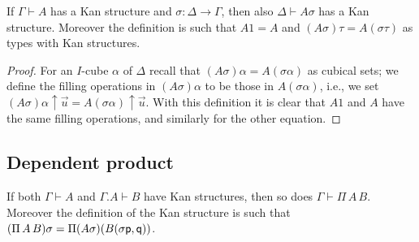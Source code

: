 \documentclass[10pt,a4paper]{article}
\newcommand{\pp}{{\sf p}}
\newcommand{\qq}{{\sf q}}
\newcommand{\rup}[1]{#1{\uparrow}}
\begin{document}
\begin{theorem}
  If $\Gamma \vdash A$ has a Kan structure and $\sigma \colon \Delta
  \to \Gamma$, then also $\Delta \vdash A \sigma$ has a Kan structure.
  Moreover the definition is such that $A 1 = A$ and $(A \sigma) \tau
  = A (\sigma \tau)$ as types with Kan structures.
\end{theorem}
\begin{proof}
  For an $I$-cube $\alpha$ of $\Delta$ recall that $(A \sigma) \alpha
  = A (\sigma \alpha)$ as cubical sets; we define the filling
  operations in $(A \sigma) \alpha$ to be those in $A (\sigma
  \alpha)$, i.e., we set $\rup{(A \sigma) \alpha} {\vec u} = \rup {A
    (\sigma \alpha)} {\vec u}$.  With this definition it is clear that
  $A 1$ and $A$ have the same filling operations, and similarly for
  the other equation.
\end{proof}

\subsection{Dependent product}

\begin{theorem}
  If both $\Gamma\vdash A$ and $\Gamma.A\vdash B$ have Kan structures,
  then so does $\Gamma\vdash\Pi\,A\,B$.  Moreover the definition of
  the Kan structure is such that $(\Pi\,A\,B) \sigma = \Pi (A \sigma)
  (B (\sigma \pp, \qq))$.
\end{theorem}
\end{document}
